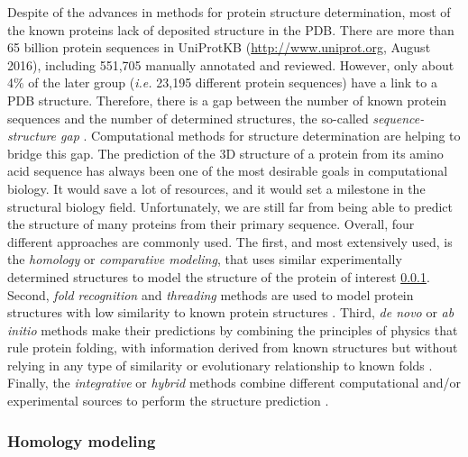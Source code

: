 \documentclass[11pt, b5paper,twoside]{tesi_upf}
\begin{document}
\par Despite of the advances in methods for protein structure determination, most of the known proteins lack of deposited structure in the PDB. There are more than 65 billion protein sequences in  UniProtKB (\url{http://www.uniprot.org}, August 2016), including 551,705 manually annotated and reviewed. However, only about 4$\%$ of the later group (\textit{i.e.} 23,195 different protein sequences) have a link to a PDB structure. Therefore, there is a gap between the number of known protein sequences and the number of determined structures, the so-called \textit{sequence-structure gap} \cite{Rost1996}. Computational methods for structure determination are helping to bridge this gap. The prediction of the 3D structure of a protein from its amino acid sequence has always been one of the most desirable goals in computational biology. It would save a lot of resources, and it would set a milestone in the structural biology field. Unfortunately, we are still far from being able to predict the structure of many proteins from their primary sequence. Overall, four different approaches are commonly used. The first, and most extensively used, is the \textit{homology} or \textit{comparative modeling}, that uses similar experimentally determined structures to model the structure of the protein of interest \cref{Homology_modeling}. Second, \textit{fold recognition} and \textit{threading} methods are used to model protein structures with low similarity to known protein structures \cite{Jones1992, Bowie1991}. Third, \textit{de novo} or \textit{ab initio} methods make their predictions by combining the principles of physics that rule protein folding, with information derived from known structures but without relying in any type of similarity or evolutionary relationship to known folds \cite{Lee2009}. Finally, the \textit{integrative} or \textit{hybrid} methods combine different computational and/or experimental sources to perform the structure prediction \cite{Russel2012}.   
 
\subsubsection{Homology modeling} \label{Homology_modeling}
\end{document}
